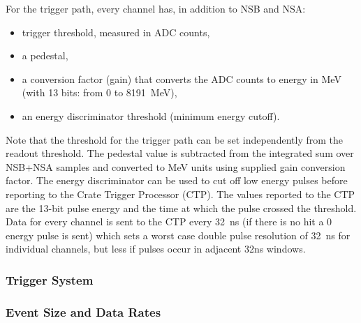 For the trigger path, every channel has, in addition to NSB and NSA: 
\begin{itemize}
 \item trigger threshold, measured in ADC counts, 
 \item a pedestal, 
 \item a conversion factor (gain) that converts the ADC counts to energy in MeV (with 13 bits:  from 0 to 8191~MeV), 
 \item an energy discriminator threshold (minimum energy cutoff).
 \end{itemize}
Note that the threshold for the trigger path can be set independently from the readout threshold.
The pedestal value is subtracted from the integrated sum over NSB+NSA samples and 
converted to MeV units using supplied gain conversion factor. The energy discriminator can be used to cut off low energy pulses before reporting to the Crate Trigger Processor (CTP). 
The values reported to the CTP are the 13-bit pulse energy and the time at which the pulse crossed the threshold. 
Data for every channel is sent to the CTP every 32~ns (if there is no hit a 0 energy pulse is sent) which sets a worst case double pulse resolution of 32~ns for individual channels, but less if pulses occur in adjacent 32ns windows.







\subsubsection{Trigger System}
\label{sec:triggerdaq}


\subsubsection{Event Size and Data Rates}

